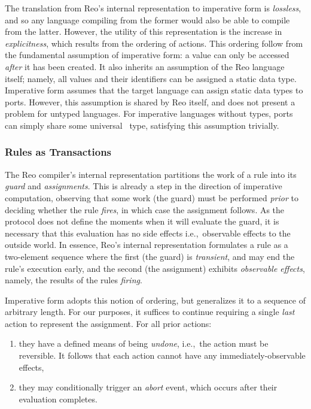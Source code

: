 The translation from Reo's internal representation to imperative form is \textit{lossless}, and so any language compiling from the former would also be able to compile from the latter. However, the utility of this representation is the increase in \textit{explicitness}, which results from the ordering of actions. This ordering follow from the fundamental assumption of imperative form: a value can only be accessed \textit{after} it has been created. It also inherits an assumption of the Reo language itself; namely, all values and their identifiers can be assigned a static data type. Imperative form assumes that the target language can assign static data types to ports. However, this assumption is shared by Reo itself, and does not present a problem for untyped languages. For imperative languages without types, ports can simply share some universal~ type, satisfying this assumption trivially.

\subsubsection{Rules as Transactions}

The Reo compiler's internal representation partitions the work of a rule into its \textit{guard} and \textit{assignments}. This is already a step in the direction of imperative computation, observing that some work (the guard) must be performed \textit{prior} to deciding whether the rule \textit{fires}, in which case the assignment follows. As the protocol does not define the moments when it will evaluate the guard, it is necessary that this evaluation has no side effects i.e.,\ observable effects to the outside world. In essence, Reo's internal representation formulates a rule as a two-element sequence where the first (the guard) is \textit{transient}, and may end the rule's execution early, and the second (the assignment) exhibits \textit{observable effects}, namely, the results of the rules \textit{firing}.

Imperative form adopts this notion of ordering, but generalizes it to a sequence of arbitrary length. For our purposes, it suffices to continue requiring a single \textit{last} action to represent the assignment. For all prior actions:
\begin{enumerate}
	\item they have a defined means of being \textit{undone}, i.e.,\ the action must be reversible. It follows that each action cannot have any immediately-observable effects,
	\item they may conditionally trigger an \textit{abort} event, which occurs after their evaluation completes.
\end{enumerate}

